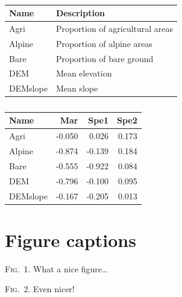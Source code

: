 \documentclass[a4paper,12pt]{article}
\begin{document}
\newpage


\begin{table}[h!]
  \caption{}
  \label{TabVar}
  \begin{center}
    \begin{tabular}{p{3cm}p{10cm}}
      Name & Description \\
      \hline
      Agri & Proportion of agricultural areas \\
      Alpine & Proportion of alpine areas \\
      Bare & Proportion of bare ground \\
      DEM & Mean elevation \\
      DEMslope & Mean slope \\
      \hline
    \end{tabular}
  \end{center}
\end{table}


\newpage


\begin{table}[h!]
  \caption{}
  \label{TabENFA}
  \begin{center}
    \begin{tabular}{lrrr}
      Name & Mar & Spe1 & Spe2 \\
      \hline
      Agri & -0.050 & 0.026 & 0.173 \\
      Alpine & -0.874 & -0.139 & 0.184 \\
      Bare & -0.555 & -0.922 & 0.084 \\
      DEM & -0.796 & -0.100 & 0.095 \\
      DEMslope & -0.167 & -0.205 & 0.013 \\
      \hline
    \end{tabular}
  \end{center}
\end{table}


\newpage


\section*{Figure captions}


\noindent \textsc{Fig}.~1. What a nice figure\dots

\bigskip

\noindent \textsc{Fig}.~2. Even nicer!


\newpage
\end{document}
